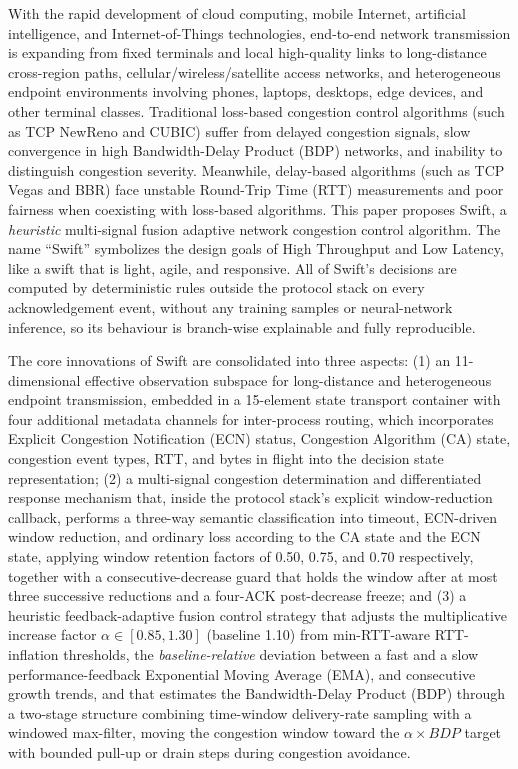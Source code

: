 \begin{englishabstract}

With the rapid development of cloud computing, mobile Internet, artificial intelligence, and Internet-of-Things technologies, end-to-end network transmission is expanding from fixed terminals and local high-quality links to long-distance cross-region paths, cellular/wireless/satellite access networks, and heterogeneous endpoint environments involving phones, laptops, desktops, edge devices, and other terminal classes. Traditional loss-based congestion control algorithms (such as TCP NewReno and CUBIC) suffer from delayed congestion signals, slow convergence in high Bandwidth-Delay Product (BDP) networks, and inability to distinguish congestion severity. Meanwhile, delay-based algorithms (such as TCP Vegas and BBR) face unstable Round-Trip Time (RTT) measurements and poor fairness when coexisting with loss-based algorithms. This paper proposes Swift, a \emph{heuristic} multi-signal fusion adaptive network congestion control algorithm. The name ``Swift'' symbolizes the design goals of High Throughput and Low Latency, like a swift that is light, agile, and responsive. All of Swift's decisions are computed by deterministic rules outside the protocol stack on every acknowledgement event, without any training samples or neural-network inference, so its behaviour is branch-wise explainable and fully reproducible.

The core innovations of Swift are consolidated into three aspects: (1) an 11-dimensional effective observation subspace for long-distance and heterogeneous endpoint transmission, embedded in a 15-element state transport container with four additional metadata channels for inter-process routing, which incorporates Explicit Congestion Notification (ECN) status, Congestion Algorithm (CA) state, congestion event types, RTT, and bytes in flight into the decision state representation; (2) a multi-signal congestion determination and differentiated response mechanism that, inside the protocol stack's explicit window-reduction callback, performs a three-way semantic classification into timeout, ECN-driven window reduction, and ordinary loss according to the CA state and the ECN state, applying window retention factors of 0.50, 0.75, and 0.70 respectively, together with a consecutive-decrease guard that holds the window after at most three successive reductions and a four-ACK post-decrease freeze; and (3) a heuristic feedback-adaptive fusion control strategy that adjusts the multiplicative increase factor $\alpha \in [0.85, 1.30]$ (baseline 1.10) from min-RTT-aware RTT-inflation thresholds, the \emph{baseline-relative} deviation between a fast and a slow performance-feedback Exponential Moving Average (EMA), and consecutive growth trends, and that estimates the Bandwidth-Delay Product (BDP) through a two-stage structure combining time-window delivery-rate sampling with a windowed max-filter, moving the congestion window toward the $\alpha \times BDP$ target with bounded pull-up or drain steps during congestion avoidance.


\end{englishabstract}
